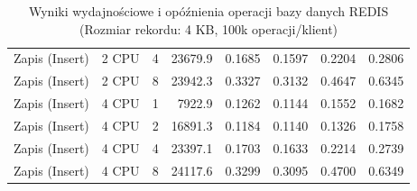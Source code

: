 \begin{table}[ht]
{\begin{tabular}{llcrrrrr}
Zapis (Insert) & 2 CPU & 4 & 23679.9 & 0.1685 & 0.1597 & 0.2204 & 0.2806 \\
Zapis (Insert) & 2 CPU & 8 & 23942.3 & 0.3327 & 0.3132 & 0.4647 & 0.6345 \\
Zapis (Insert) & 4 CPU & 1 & 7922.9 & 0.1262 & 0.1144 & 0.1552 & 0.1682 \\
Zapis (Insert) & 4 CPU & 2 & 16891.3 & 0.1184 & 0.1140 & 0.1326 & 0.1758 \\
Zapis (Insert) & 4 CPU & 4 & 23397.1 & 0.1703 & 0.1633 & 0.2214 & 0.2739 \\
Zapis (Insert) & 4 CPU & 8 & 24117.6 & 0.3299 & 0.3095 & 0.4700 & 0.6349 \\
\bottomrule
\end{tabular}%
}
\caption{Wyniki wydajnościowe i opóźnienia operacji bazy danych REDIS (Rozmiar rekordu: 4 KB, 100k operacji/klient)}
\label{tab:latency_redis_medium_100000}
\end{table}
